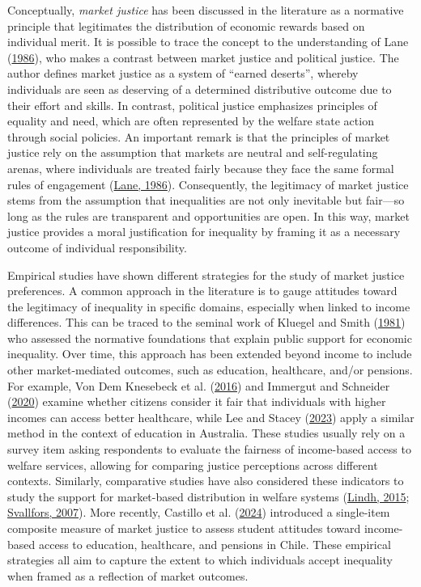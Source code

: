 \documentclass[
  12pt,
]{article}
\begin{document}
Conceptually, \emph{market justice} has been discussed in the literature
as a normative principle that legitimates the distribution of economic
rewards based on individual merit. It is possible to trace the concept
to the understanding of Lane
(\protect\hyperlink{ref-lane_market_1986}{1986}), who makes a contrast
between market justice and political justice. The author defines market
justice as a system of ``earned deserts'', whereby individuals are seen
as deserving of a determined distributive outcome due to their effort
and skills. In contrast, political justice emphasizes principles of
equality and need, which are often represented by the welfare state
action through social policies. An important remark is that the
principles of market justice rely on the assumption that markets are
neutral and self-regulating arenas, where individuals are treated fairly
because they face the same formal rules of engagement
(\protect\hyperlink{ref-lane_market_1986}{Lane, 1986}). Consequently,
the legitimacy of market justice stems from the assumption that
inequalities are not only inevitable but fair---so long as the rules are
transparent and opportunities are open. In this way, market justice
provides a moral justification for inequality by framing it as a
necessary outcome of individual responsibility.

Empirical studies have shown different strategies for the study of
market justice preferences. A common approach in the literature is to
gauge attitudes toward the legitimacy of inequality in specific domains,
especially when linked to income differences. This can be traced to the
seminal work of Kluegel and Smith
(\protect\hyperlink{ref-kluegel_beliefs_1981}{1981}) who assessed the
normative foundations that explain public support for economic
inequality. Over time, this approach has been extended beyond income to
include other market-mediated outcomes, such as education, healthcare,
and/or pensions. For example, Von Dem Knesebeck et al.
(\protect\hyperlink{ref-vondemknesebeck_are_2016}{2016}) and Immergut
and Schneider (\protect\hyperlink{ref-immergut_it_2020}{2020}) examine
whether citizens consider it fair that individuals with higher incomes
can access better healthcare, while Lee and Stacey
(\protect\hyperlink{ref-lee_fairness_2023}{2023}) apply a similar method
in the context of education in Australia. These studies usually rely on
a survey item asking respondents to evaluate the fairness of
income-based access to welfare services, allowing for comparing justice
perceptions across different contexts. Similarly, comparative studies
have also considered these indicators to study the support for
market-based distribution in welfare systems
(\protect\hyperlink{ref-lindh_public_2015}{Lindh, 2015};
\protect\hyperlink{ref-svallfors_political_2007}{Svallfors, 2007}). More
recently, Castillo et al.
(\protect\hyperlink{ref-castillo_socialization_2024}{2024}) introduced a
single-item composite measure of market justice to assess student
attitudes toward income-based access to education, healthcare, and
pensions in Chile. These empirical strategies all aim to capture the
extent to which individuals accept inequality when framed as a
reflection of market outcomes.
\end{document}
